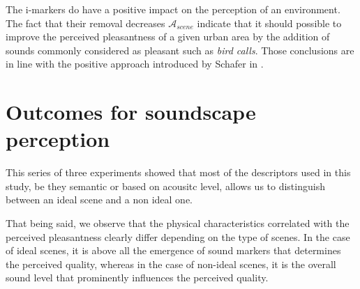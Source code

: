 \documentclass[12pt]{elsarticle}
\begin{document}

The i-markers do have a positive impact on the perception of an environment. The fact that their removal decreases $\mathcal{A}_{scene}$ indicate that it should possible to improve the perceived pleasantness of a given urban area by the addition of sounds commonly considered as pleasant such as \emph{bird calls}. Those conclusions are in line with the positive approach introduced by Schafer in \cite{schafer1977tuning}.



\section{Outcomes for soundscape perception}
\label{sec:conclusion}

This series of three experiments showed that most of the descriptors used in this study, be they semantic or based on acousitc level, allows us to distinguish between an ideal scene and a non ideal one.


That being said, we observe that the physical characteristics correlated with the perceived pleasantness clearly differ depending on the type of scenes. In the case of ideal scenes, it is above all the emergence of sound markers that determines the perceived quality, whereas in the case of non-ideal scenes, it is the overall sound level that prominently influences the perceived quality.
\end{document}

